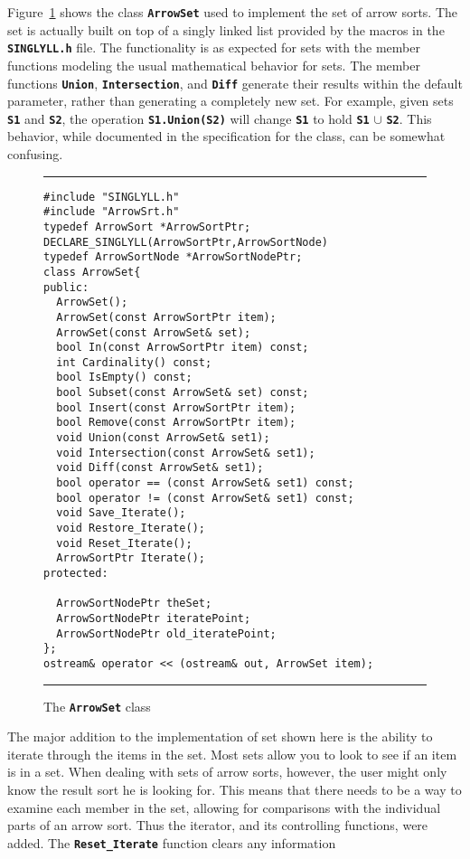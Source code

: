 \documentclass[12pt]{article} %
\newcommand{\reserved}[1]{\textbf{\texttt{#1}}} %
\newcommand{\UNSPACEFORBOX}{\vspace{-2ex}}
\newcommand{\HLINE}{\UNSPACEFORBOX%
\begin{flushleft}\rule{\textwidth}{0.01in}\end{flushleft}%
\UNSPACEFORBOX}
\newenvironment{BFIGURE}{

\begin{figure}
\small
\HLINE
}{
\HLINE
\normalsize
\end{figure}
}
\begin{document}
Figure~\ref{ArrowSet} shows the class \reserved{ArrowSet} used to
implement the set of arrow sorts. The set is actually built on top of
a singly linked list provided by the macros in the
\reserved{SINGLYLL.h} file. The functionality is as expected for
sets with the member functions modeling the usual mathematical
behavior for sets. The member functions \reserved{Union},
\reserved{Intersection}, and \reserved{Diff} generate their results
within the default parameter, rather than generating a completely new
set. For example, given sets \reserved{S1} and \reserved{S2}, the
operation \reserved{S1.Union(S2)} will change \reserved{S1} to hold
\reserved{S1} $\cup$ \reserved{S2}. This behavior, while documented in
the specification for the class, can be somewhat confusing.

\begin{BFIGURE}
\begin{verbatim}
#include "SINGLYLL.h"
#include "ArrowSrt.h"
typedef ArrowSort *ArrowSortPtr;
DECLARE_SINGLYLL(ArrowSortPtr,ArrowSortNode)
typedef ArrowSortNode *ArrowSortNodePtr;
class ArrowSet{
public:
  ArrowSet();
  ArrowSet(const ArrowSortPtr item);
  ArrowSet(const ArrowSet& set);
  bool In(const ArrowSortPtr item) const;
  int Cardinality() const;
  bool IsEmpty() const;
  bool Subset(const ArrowSet& set) const;
  bool Insert(const ArrowSortPtr item);
  bool Remove(const ArrowSortPtr item);
  void Union(const ArrowSet& set1);
  void Intersection(const ArrowSet& set1);
  void Diff(const ArrowSet& set1);
  bool operator == (const ArrowSet& set1) const;
  bool operator != (const ArrowSet& set1) const;
  void Save_Iterate();
  void Restore_Iterate();
  void Reset_Iterate();
  ArrowSortPtr Iterate();
protected:
  
  ArrowSortNodePtr theSet;
  ArrowSortNodePtr iteratePoint;
  ArrowSortNodePtr old_iteratePoint;
};
ostream& operator << (ostream& out, ArrowSet item);
\end{verbatim}
\caption{The \reserved{ArrowSet} class}
\label{ArrowSet}
\end{BFIGURE}
The major addition to the implementation of set shown here is the
ability to iterate through the items in the set. Most sets allow you
to look to see if an item is in a set. When dealing with sets of arrow
sorts, however, the user might only know the result sort he is looking
for. This means that there needs to be a way to examine each member in
the set, allowing for comparisons with the individual parts of an
arrow sort. Thus the iterator, and its controlling functions, were
added. The \reserved{Reset\_Iterate} function clears any information
\end{document}
